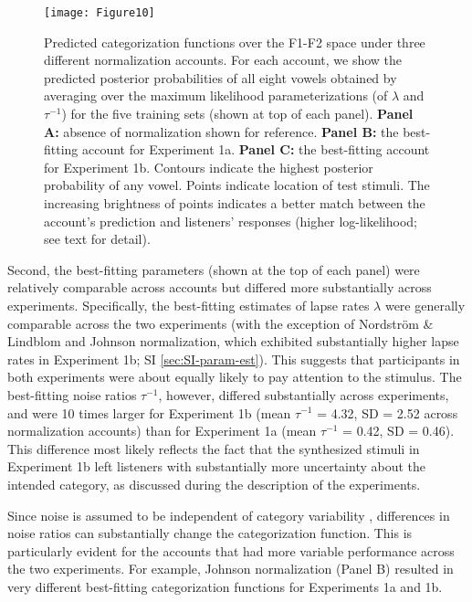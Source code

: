 \documentclass[preprint]{JASA}
\begin{document}
\begin{figure}[!ht]

{\centering \texttt{[image: Figure10]} 

}

\caption{Predicted categorization functions over the F1-F2 space under three different normalization accounts. For each account, we show the predicted posterior probabilities of all eight vowels obtained by averaging over the maximum likelihood parameterizations (of \(\lambda\) and \(\tau^{-1}\)) for the five training sets (shown at top of each panel). \textbf{Panel A:} absence of normalization shown for reference. \textbf{Panel B:} the best-fitting account for Experiment 1a. \textbf{Panel C:} the best-fitting account for Experiment 1b. Contours indicate the highest posterior probability of any vowel. Points indicate location of test stimuli. The increasing brightness of points indicates a better match between the account's prediction and listeners' responses (higher log-likelihood; see text for detail).}\label{fig:Figure10}
\end{figure}

Second, the best-fitting parameters (shown at the top of each panel) were relatively comparable across accounts but differed more substantially across experiments. Specifically, the best-fitting estimates of lapse rates \(\lambda\) were generally comparable across the two experiments (with the exception of Nordström \& Lindblom and Johnson normalization, which exhibited substantially higher lapse rates in Experiment 1b; SI \ref{sec:SI-param-est}). This suggests that participants in both experiments were about equally likely to pay attention to the stimulus. The best-fitting noise ratios \(\tau^{-1}\), however, differed substantially across experiments, and were 10 times larger for Experiment 1b (mean \(\tau^{-1}\) = 4.32, SD = 2.52 across normalization accounts) than for Experiment 1a (mean \(\tau^{-1}\) = 0.42, SD = 0.46). This difference most likely reflects the fact that the synthesized stimuli in Experiment 1b left listeners with substantially more uncertainty about the intended category, as discussed during the description of the experiments.

Since noise is assumed to be independent of category variability \citep[see also][]{feldman2009, kronrod2016}, differences in noise ratios can substantially change the categorization function. This is particularly evident for the accounts that had more variable performance across the two experiments. For example, Johnson normalization (Panel B) resulted in very different best-fitting categorization functions for Experiments 1a and 1b.
\end{document}
